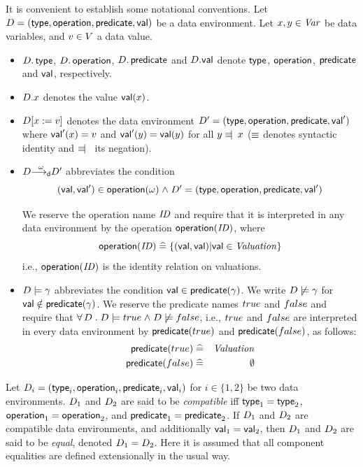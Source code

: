 \begin{notation}
It is convenient to establish some notational conventions.  Let ${D} =
(\mathop{\sf type}, \mathop{\sf operation}, \mathop{\sf predicate}, {\mathop{\sf val}})$ be a data environment. Let
$x,y \in {\text{\it Var\/}}$ be data variables, and ${v} \in V$ a data value.
\begin{itemize}
\item ${D}.\mathop{\sf type}$, ${D}.\mathop{\sf operation}$, ${D}.\mathop{\sf predicate}$ and
  ${D}.{\mathop{\sf val}}$ denote $\mathop{\sf type}$, $\mathop{\sf operation}$, $\mathop{\sf predicate}$ and ${\mathop{\sf val}}$,
  respectively. 
\item  ${D}.x$ denotes the value ${\mathop{\sf val}}(x)$.
\item ${D}[x\mathrel{:=}{v}]$ denotes the data environment 
  ${D}' = (\mathop{\sf type}, \mathop{\sf operation}, \mathop{\sf predicate}, {\mathop{\sf val}}')$ where 
  ${\mathop{\sf val}}'(x) = {v}$ and ${\mathop{\sf val}}'(y) = {\mathop{\sf val}}(y)$ for all $y \equiv\hspace{-.5em}|\hspace{.5em} x$ 
  ($\equiv$ denotes syntactic identity and $\equiv\hspace{-.5em}|\hspace{.5em}$ its negation).
\item ${D} {\mathrel{{\stackrel{\omega}{\longrightarrow_{\mathrm{{\sf d}}}}}}} {D}'$ abbreviates the condition
  \[ ({\mathop{\sf val}},{\mathop{\sf val}}') \in \mathop{\sf operation}(\omega) \mathrel{\wedge} {D}' = (\mathop{\sf type}, \mathop{\sf operation},
  \mathop{\sf predicate}, {\mathop{\sf val}}') \]

  We reserve the operation name ${\text{\it ID\/}}$ and require that it is
  interpreted in any data environment by the operation
  $\mathop{\sf operation}({\text{\it ID\/}})$, where 
  \[
    \mathop{\sf operation}({\text{\it ID\/}}) \mathrel{\widehat=} \{({\mathop{\sf val}},{\mathop{\sf val}})| {\mathop{\sf val}} \in {\text{\it Valuation\/}}\}
  \] 
  i.e., $\mathop{\sf operation}({\text{\it ID\/}})$ is the identity relation on valuations.
\item ${D} \models \gamma$ abbreviates the condition ${\mathop{\sf val}} \in \mathop{\sf predicate}(\gamma)$.
  We write ${D} \not \models \gamma$ for ${\mathop{\sf val}} \notin \mathop{\sf predicate}(\gamma)$. We
  reserve the predicate names ${true}$ and ${false}$ and require that
  $\forall \D \such \D \models \True \land \D \not \models \False$,
  i.e., ${true}$ and ${false}$ are interpreted in every data environment
  by $\mathop{\sf predicate}({true})$ and $\mathop{\sf predicate}({false})$, as follows:
  \begin{eqnarray*} \mathop{\sf predicate}({true}) & \mathrel{\widehat=} & {\text{\it Valuation\/}} \\
  \mathop{\sf predicate}({false}) & \mathrel{\widehat=} & \emptyset \end{eqnarray*}
\end{itemize}
\end{notation}
Let ${D}_i = (\mathop{\sf type}_i, \mathop{\sf operation}_i, \mathop{\sf predicate}_i, {\mathop{\sf val}}_i)$ for $i \in
\{1,2\}$ be two data environments. ${D}_1$ and ${D}_2$ are said to be 
\emph{compatible} iff $\mathop{\sf type}_1 = \mathop{\sf type}_2$, $\mathop{\sf operation}_1 = \mathop{\sf operation}_2$, and
$\mathop{\sf predicate}_1 = \mathop{\sf predicate}_2$. If ${D}_1$ and ${D}_2$ are compatible
data environments, and additionally ${\mathop{\sf val}}_1 = {\mathop{\sf val}}_2$, then ${D}_1$ and
${D}_2$ are said to be \emph{equal}, denoted ${D}_1 = {D}_2$. Here it is
assumed that all component equalities are defined extensionally in the
usual way.
 

